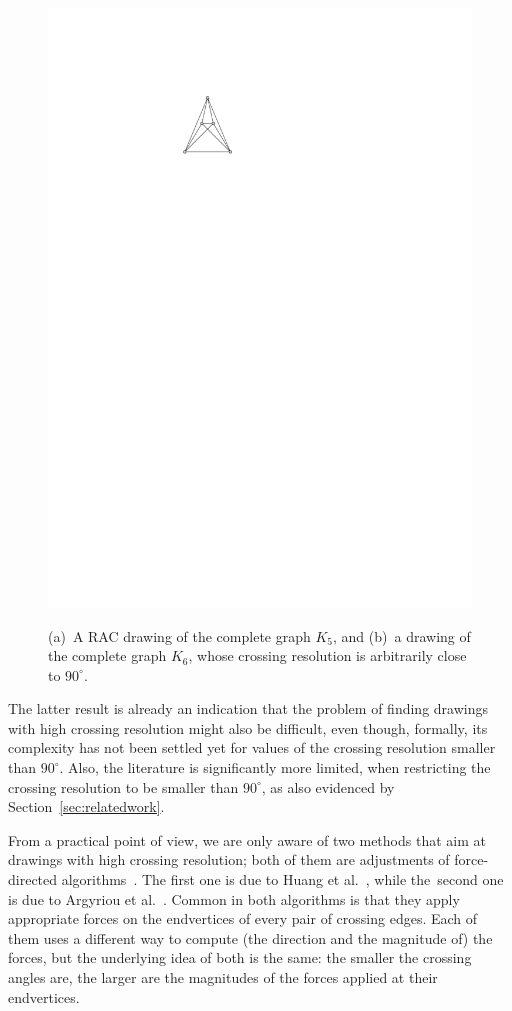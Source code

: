 \documentclass[runningheads]{llncs}
\begin{document}
\begin{figure}[t!]
{	\includegraphics[page=2,scale=0.85]{figures/examples}}
	\caption{%
	(a)~A RAC drawing of the complete graph $K_5$, and
	(b)~a drawing of the complete graph $K_6$, whose crossing resolution is arbitrarily close to $90^\circ$.}
	\label{fig:examples}
\end{figure} 

The latter result is already an indication that the problem of finding drawings with high crossing resolution might also be difficult, even though, formally, its complexity has not been settled yet for values of the crossing resolution smaller than $90^\circ$. Also, the literature is significantly more limited, when restricting the crossing resolution to be smaller than $90^\circ$, as also evidenced by Section~\ref{sec:relatedwork}. 

From a practical point of view, we are only aware of two methods that aim at drawings with high crossing resolution; both of them are adjustments of force-directed algorithms~\cite{DBLP:journals/congnum/Eades84}. The first one is due to Huang et al.~\cite{DBLP:journals/vlc/HuangEHL13}, while the~second one is due to Argyriou et al.~\cite{DBLP:journals/cj/ArgyriouBS13}. Common in both algorithms is that they apply appropriate forces on the endvertices of every pair of crossing edges. Each of them uses a different way to compute (the direction and the magnitude of) the forces, but the underlying idea of both is the same: the smaller the crossing angles are, the larger are the magnitudes of the forces applied at their endvertices. 
\end{document}
